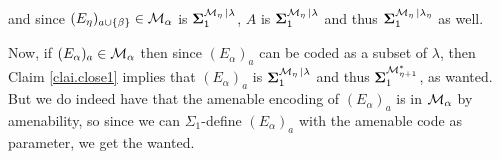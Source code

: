 {{and since $(E_\eta)_{a\cup\{\beta\}}\in\operatorname{\mathcal{M}}_\alpha$ is ${\bf \Sigma}_1^{\operatorname{\mathcal{M}}_\eta|\lambda}$, $A$ is ${\bf \Sigma}_1^{\operatorname{\mathcal{M}}_\eta|\lambda}$ and thus ${\bf \Sigma}_1^{\operatorname{\mathcal{M}}_\eta|\lambda_\eta}$ as well.
}

Now, if $(E_\alpha)_a\in\operatorname{\mathcal{M}}_\alpha$ then since $(E_\alpha)_a$ can be coded as a subset of $\lambda$, then Claim \ref{clai.close1} implies that $(E_\alpha)_a$ is ${\bf \Sigma}_1^{\operatorname{\mathcal{M}}_\eta|\lambda}$ and thus ${\bf \Sigma}_1^{\operatorname{\mathcal{M}}_{\eta+1}^*}$, as wanted. But we do indeed have that the amenable encoding of $(E_\alpha)_a$ is in $\operatorname{\mathcal{M}}_\alpha$ by amenability, so since we can $\Sigma_1$-define $(E_\alpha)_a$ with the amenable code as parameter, we get the wanted.
%
%
%
%
%
%
%
}

